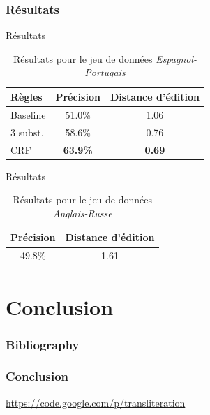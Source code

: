 \documentclass{beamer}
\begin{document}
\begin{frame}
\frametitle{Résultats}
\begin{block}{Résultats}
\begin{center}
\begin{table}[H]
\caption{Résultats pour le jeu de données \emph{Espagnol-Portugais} }
\begin{tabular}{|l|c|c|}
\hline
Règles&Précision&Distance d'édition\\
\hline
Baseline&51.0\%&1.06\\
\hline
3 subst.&58.6\%&0.76\\
\hline
CRF&\textbf{63.9\%}&\textbf{0.69}\\
\hline
\end{tabular}
\end{table}
\end{center}
\end{block}

\begin{block}{Résultats}
\begin{center}
\begin{table}[H]
\caption{Résultats pour le jeu de données \emph{Anglais-Russe} }
\begin{center}
\begin{tabular}{|c|c|}
\hline
Précision&Distance d'édition\\
\hline
49.8\%&1.61\\
\hline
\end{tabular}
\end{center}
\end{table}
\end{center}
\end{block}

\end{frame}

\section{Conclusion}
\begin{frame}
\end{frame}
\begin{frame}[allowframebreaks]
    \frametitle{Bibliography}
    {\fontsize{0.8em}{1em}
    \nocite{*}
    
    }
\end{frame}

\begin{frame}
    \frametitle{Conclusion}
    \url{https://code.google.com/p/transliteration}
\end{frame}
\end{document}
